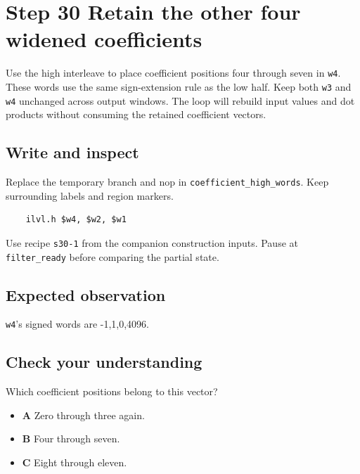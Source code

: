 \section{Step 30 Retain the other four widened coefficients}\label{fir-s30}

Use the high interleave to place coefficient positions four through seven in \texttt{w4}. These words use the same sign-extension rule as the low half. Keep both \texttt{w3} and \texttt{w4} unchanged across output windows. The loop will rebuild input values and dot products without consuming the retained coefficient vectors.

\subsection{Write and inspect}
Replace the temporary branch and nop in \texttt{coefficient\_high\_words}. Keep surrounding labels and region markers.

\begin{verbatim}
    ilvl.h $w4, $w2, $w1
\end{verbatim}
Use recipe \texttt{s30-1} from the companion construction inputs. Pause at \texttt{filter\_ready} before comparing the partial state.

\subsection{Expected observation}
\texttt{w4}’s signed words are -1,1,0,4096.

\subsection{Check your understanding}
Which coefficient positions belong to this vector?

\begin{itemize}
\item \textbf{A} Zero through three again.
\item \textbf{B} Four through seven.
\item \textbf{C} Eight through eleven.
\end{itemize}
